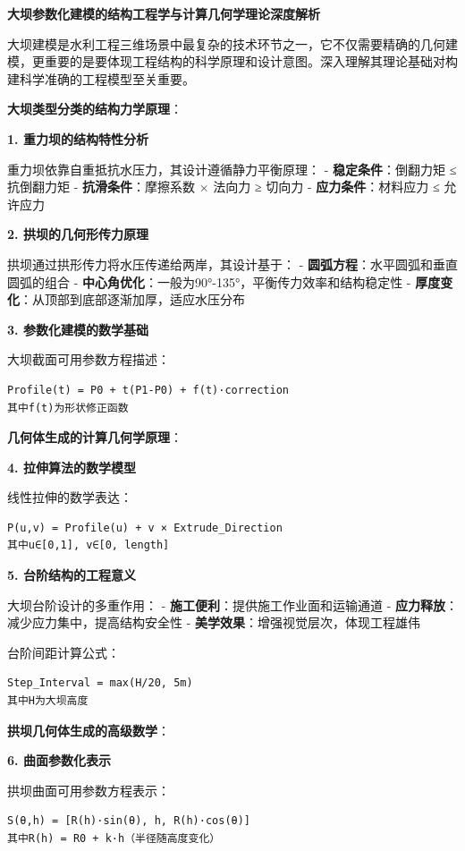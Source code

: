 \textbf{大坝参数化建模的结构工程学与计算几何学理论深度解析}

大坝建模是水利工程三维场景中最复杂的技术环节之一，它不仅需要精确的几何建模，更重要的是要体现工程结构的科学原理和设计意图。深入理解其理论基础对构建科学准确的工程模型至关重要。

\textbf{大坝类型分类的结构力学原理}：

\textbf{1. 重力坝的结构特性分析}

重力坝依靠自重抵抗水压力，其设计遵循静力平衡原理： - \textbf{稳定条件}：倒翻力矩 ≤ 抗倒翻力矩 - \textbf{抗滑条件}：摩擦系数 × 法向力 ≥ 切向力 - \textbf{应力条件}：材料应力 ≤ 允许应力

\textbf{2. 拱坝的几何形传力原理}

拱坝通过拱形传力将水压传递给两岸，其设计基于： - \textbf{圆弧方程}：水平圆弧和垂直圆弧的组合 - \textbf{中心角优化}：一般为90°-135°，平衡传力效率和结构稳定性 - \textbf{厚度变化}：从顶部到底部逐渐加厚，适应水压分布

\textbf{3. 参数化建模的数学基础}

大坝截面可用参数方程描述：

\begin{lstlisting}
Profile(t) = P0 + t(P1-P0) + f(t)·correction
其中f(t)为形状修正函数
\end{lstlisting}

\textbf{几何体生成的计算几何学原理}：

\textbf{4. 拉伸算法的数学模型}

线性拉伸的数学表达：

\begin{lstlisting}
P(u,v) = Profile(u) + v × Extrude_Direction
其中u∈[0,1], v∈[0, length]
\end{lstlisting}

\textbf{5. 台阶结构的工程意义}

大坝台阶设计的多重作用： - \textbf{施工便利}：提供施工作业面和运输通道 - \textbf{应力释放}：减少应力集中，提高结构安全性 - \textbf{美学效果}：增强视觉层次，体现工程雄伟

台阶间距计算公式：

\begin{lstlisting}
Step_Interval = max(H/20, 5m)
其中H为大坝高度
\end{lstlisting}

\textbf{拱坝几何体生成的高级数学}：

\textbf{6. 曲面参数化表示}

拱坝曲面可用参数方程表示：

\begin{lstlisting}
S(θ,h) = [R(h)·sin(θ), h, R(h)·cos(θ)]
其中R(h) = R0 + k·h（半径随高度变化）
\end{lstlisting}

